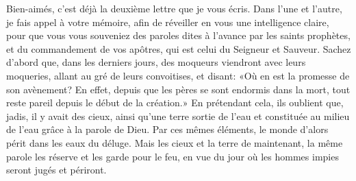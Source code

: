 Bien-aimés, c’est déjà la deuxième lettre que je vous écris.
Dans l’une et l’autre, je fais appel à votre mémoire,
	afin de réveiller en vous une intelligence claire,
	pour que vous vous souveniez des paroles
		dites à l’avance par les saints prophètes,
	et du commandement de vos apôtres, qui est celui du Seigneur et Sauveur.
Sachez d’abord que, dans les derniers jours,
	des moqueurs viendront avec leurs moqueries,
	allant au gré de leurs convoitises, et disant:
	«Où en est la promesse de son avènement?
	En effet, depuis que les pères se sont endormis dans la mort,
	tout reste pareil depuis le début de la création.»
En prétendant cela, ils oublient que, jadis, il y avait des cieux,
	ainsi qu’une terre sortie de l’eau
	et constituée au milieu de l’eau grâce à la parole de Dieu.
Par ces mêmes éléments,
	le monde d’alors périt dans les eaux du déluge.
Mais les cieux et la terre de maintenant,
	la même parole les réserve et les garde pour le feu,
	en vue du jour où les hommes impies seront jugés et périront.
